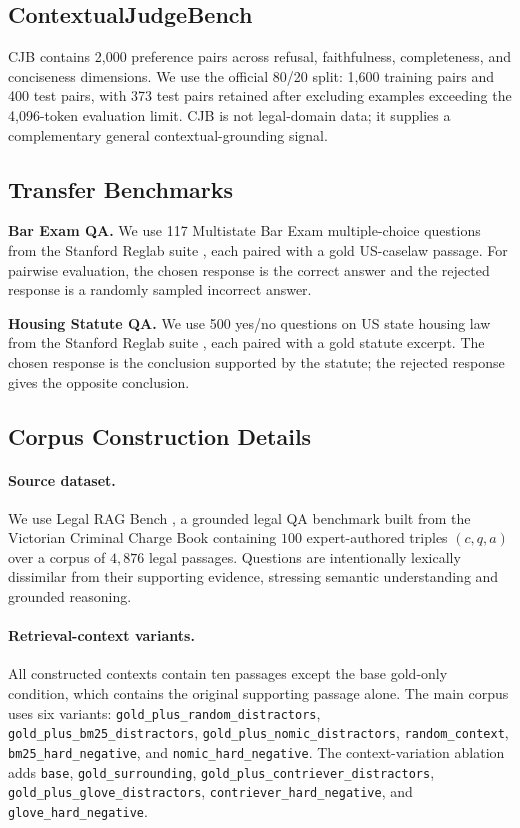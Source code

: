 \documentclass{article}
\theoremstyle{plain}
\theoremstyle{definition}
\theoremstyle{remark}
\begin{document}
\subsection*{ContextualJudgeBench}

CJB contains 2{,}000 preference pairs across refusal, faithfulness, completeness, and conciseness dimensions.  We use the official 80/20 split: 1{,}600 training pairs and 400 test pairs, with 373 test pairs retained after excluding examples exceeding the 4{,}096-token evaluation limit.  CJB is not legal-domain data; it supplies a complementary general contextual-grounding signal.

\subsection*{Transfer Benchmarks}

\textbf{Bar Exam QA.} We use 117 Multistate Bar Exam multiple-choice questions from the Stanford Reglab suite \citep{Zheng_2025}, each paired with a gold US-caselaw passage.  For pairwise evaluation, the chosen response is the correct answer and the rejected response is a randomly sampled incorrect answer.

\textbf{Housing Statute QA.} We use 500 yes/no questions on US state housing law from the Stanford Reglab suite \citep{Zheng_2025}, each paired with a gold statute excerpt.  The chosen response is the conclusion supported by the statute; the rejected response gives the opposite conclusion.

\subsection{Corpus Construction Details}
\label{app:corpus}

\paragraph{Source dataset.}
We use Legal RAG Bench \citep{butler2026legalragbenchendtoend}, a grounded legal QA benchmark built from the Victorian Criminal Charge Book containing $100$ expert-authored triples $(c,q,a)$ over a corpus of $4{,}876$ legal passages.  Questions are intentionally lexically dissimilar from their supporting evidence, stressing semantic understanding and grounded reasoning.

\paragraph{Retrieval-context variants.}
All constructed contexts contain ten passages except the base gold-only condition, which contains the original supporting passage alone.  The main corpus uses six variants: \texttt{gold\_plus\_random\_distractors}, \texttt{gold\_plus\_bm25\_distractors}, \texttt{gold\_plus\_nomic\_distractors}, \texttt{random\_context}, \texttt{bm25\_hard\_negative}, and \texttt{nomic\_hard\_negative}.  The context-variation ablation adds \texttt{base}, \texttt{gold\_surrounding}, \texttt{gold\_plus\_contriever\_distractors}, \texttt{gold\_plus\_glove\_distractors}, \texttt{contriever\_hard\_negative}, and \texttt{glove\_hard\_negative}.
\end{document}
